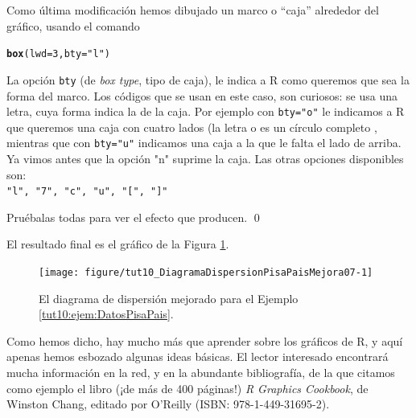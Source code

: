 \documentclass[10pt,a4paper]{article}\usepackage[]{graphicx}\usepackage[]{color}
\makeatletter
\newcommand{\hlnum}[1]{\textcolor[rgb]{0.686,0.059,0.569}{#1}}%
\newcommand{\hlstr}[1]{\textcolor[rgb]{0.192,0.494,0.8}{#1}}%
\newcommand{\hlstd}[1]{\textcolor[rgb]{0.345,0.345,0.345}{#1}}%
\newcommand{\hlkwc}[1]{\textcolor[rgb]{0.333,0.667,0.333}{#1}}%
\newcommand{\hlkwd}[1]{\textcolor[rgb]{0.737,0.353,0.396}{\textbf{#1}}}%
\newenvironment{kframe}{%
 \def\at@end@of@kframe{}%
 \ifinner\ifhmode%
  \def\at@end@of@kframe{\end{minipage}}%
  \begin{minipage}{\columnwidth}%
 \fi\fi%
 \def\FrameCommand##1{\hskip\@totalleftmargin \hskip-\fboxsep
 \colorbox{shadecolor}{##1}\hskip-\fboxsep
     \hskip-\linewidth \hskip-\@totalleftmargin \hskip\columnwidth}%
 \MakeFramed {\advance\hsize-\width
   \@totalleftmargin\z@ \linewidth\hsize
   \@setminipage}}%
 {\par\unskip\endMakeFramed%
 \at@end@of@kframe}
\newenvironment{knitrout}{}{} %
\newcounter {cont01}
\makeatother
\begin{document}
Como última modificación hemos dibujado un marco o ``caja'' alrededor del gráfico, usando el comando
\begin{knitrout}
\color{fgcolor}\begin{kframe}
\begin{alltt}
\hlkwd{box}\hlstd{(}\hlkwc{lwd}\hlstd{=}\hlnum{3}\hlstd{,}\hlkwc{bty}\hlstd{=}\hlstr{"l"}\hlstd{)}
\end{alltt}
\end{kframe}
\end{knitrout}
La opción {\tt bty} (de {\em box type}, tipo de caja), le indica a R como queremos que sea la forma del marco. Los códigos que se usan en este caso, son curiosos: se usa una letra, cuya forma indica la de la caja. Por ejemplo con \verb#bty="o"# le indicamos a R que queremos una caja con cuatro lados (la letra o es un círculo completo , mientras que con \verb#bty="u"# indicamos una caja a la que le falta el lado de arriba. Ya vimos antes que la opción "n" suprime la caja. Las otras opciones disponibles son:\\
\verb#"l", "7", "c", "u", "[", "]" #
\begin{ejercicio}
\label{tut10:ejercicio05}
Pruébalas todas para ver el efecto que producen.
\qed
\end{ejercicio}

El resultado final es el gráfico de la Figura \ref{tut10:fig:DiagramaDispersionPisaPaisMejora03}.
\begin{figure}[htb]
\begin{center}
\begin{knitrout}
\color{fgcolor}
\texttt{[image: figure/tut10\_DiagramaDispersionPisaPaisMejora07-1]} 

\end{knitrout}
\end{center}
\caption{El  diagrama de dispersión mejorado para el Ejemplo \ref{tut10:ejem:DatosPisaPais}.}
\label{tut10:fig:DiagramaDispersionPisaPaisMejora03}
\end{figure}
Como hemos dicho, hay mucho más que aprender sobre los gráficos de R, y aquí apenas hemos esbozado algunas ideas básicas. El lector interesado encontrará mucha información en la red, y en la abundante bibliografía, de la que citamos como ejemplo el libro (¡de más de 400 páginas!) {\em R Graphics Cookbook}, de Winston Chang, editado por O'Reilly (ISBN: 978-1-449-31695-2).
\end{document}
